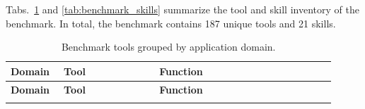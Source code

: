 \documentclass{llmxive}
\begin{document}
Tabs.~\ref{tab:benchmark_tools} and \ref{tab:benchmark_skills} summarize the tool and skill inventory of the benchmark. In total, the benchmark contains 187 unique tools and 21 skills. 

\par\medskip
\begingroup
\footnotesize
\setlength{\LTpre}{8pt}
\setlength{\LTpost}{0pt}
\setlength{\tabcolsep}{3pt}
\begin{longtable}{@{}p{0.15\linewidth}p{0.27\linewidth}p{0.50\linewidth}@{}}
\caption{Benchmark tools grouped by application domain.}
\label{tab:benchmark_tools}\\
\toprule
\textbf{Domain} & \textbf{Tool} & \textbf{Function} \\
\midrule
\endfirsthead

\toprule
\textbf{Domain} & \textbf{Tool} & \textbf{Function} \\
\midrule
\endhead

\endfoot

\bottomrule
\endlastfoot


\end{longtable}
\end{document}
